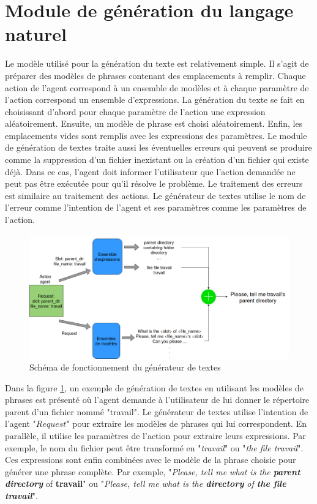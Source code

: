 \section{Module de génération du langage naturel}
Le modèle utilisé pour la génération du texte est relativement simple. Il s'agit de préparer des modèles de phrases contenant des emplacements à remplir. Chaque action de l'agent correspond à un ensemble de modèles et à chaque paramètre de l'action correspond un ensemble d'expressions. La génération du texte se fait en choisissant d'abord pour chaque paramètre de l'action une expression aléatoirement. Ensuite, un modèle de phrase est choisi aléatoirement. Enfin, les emplacements vides sont remplis avec les expressions des paramètres. Le module de génération de textes traite aussi les éventuelles erreurs qui peuvent se produire comme la suppression d'un fichier inexistant ou la création d'un fichier qui existe déjà. Dans ce cas, l'agent doit informer l'utilisateur que l'action demandée ne peut pas être exécutée pour qu'il résolve le problème. Le traitement des erreurs est similaire au traitement des actions. Le générateur de textes utilise le nom de l'erreur comme l'intention de l'agent et ses paramètres comme les paramètres de l'action.
\begin{figure}[H]
	\centering
	\includegraphics[width=0.95\linewidth]{images/Conception/NLG.png}
	\caption{Schéma de fonctionnement du générateur de textes}\label{nlg_schema}
\end{figure}
\par
Dans la figure \ref{nlg_schema}, un exemple de génération de textes en utilisant les modèles de phrases est présenté où l'agent demande à l'utilisateur de lui donner le répertoire parent d'un fichier nommé "travail". Le générateur de textes utilise l'intention de l'agent "$Request$" pour extraire les modèles de phrases qui lui correspondent. En parallèle, il utilise les paramètres de l'action pour extraire leurs expressions. Par exemple, le nom du fichier peut être transformé en "\textit{travail}" ou "\textit{the file travail}". Ces expressions sont enfin combinées avec le modèle de la phrase choisie pour générer une phrase complète. Par exemple, "\textit{Please, tell me what is the \textbf{parent directory}} of \textbf{travail}" ou "\textit{Please, tell me what is the \textbf{directory} of \textbf{the file travail}}".
